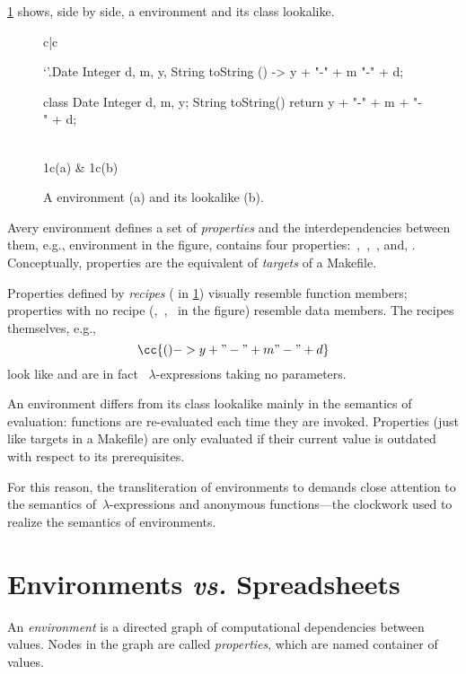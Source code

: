\cref{figure:date} shows, side by side, a \Reap environment and its \Java
class lookalike.

\begin{figure}
  \caption{\label{figure:date}%
    A \Reap environment (a) and its \Java lookalike (b).
  }
  \begin{tabular}{c|c}
    \begin{reap}
    `'.Date {
    Integer d, m, y,
    String toString () ->
    y + "-" + m "-" + d;
    }
    \end{reap}

    \begin{java}
    class Date {
    Integer d, m, y;
    String toString() {
    return
    y + "-" + m + "-" + d;
      }
    }
    \end{java}
      \\ \multicolumn1c{(a)} & \multicolumn1c{(b)}
  \end{tabular}
\end{figure}

Avery environment defines a set of \emph{properties} and the interdependencies
between them, e.g., environment  in the figure, contains four
properties:~,~,~, and, . Conceptually,
properties are the equivalent of \emph{targets} of a Makefile.

Properties defined by \emph{recipes} ( in \cref{figure:date})
visually resemble function members; properties with no recipe
(,~,~ in the figure) resemble data members.
The recipes themselves, e.g., \[
\cc{ () -> y + "-" + m "-" + d}
\] look like and are in fact \Java~$λ$-expressions taking no parameters.

An environment differs from its class lookalike mainly in the semantics of
evaluation: functions are re-evaluated each time they are invoked. Properties
(just like targets in a Makefile) are only evaluated if their current value
is outdated with respect to its prerequisites.

For this reason, the transliteration of environments to \Java demands close
attention to the semantics of~$λ$-expressions and anonymous functions---the
\Java clockwork used to realize the semantics of environments.

\section{Environments \emph{vs.} Spreadsheets}

An \emph{environment} is a directed graph of computational dependencies between
values. Nodes in the graph are called \emph{properties}, which are named
container of values.

